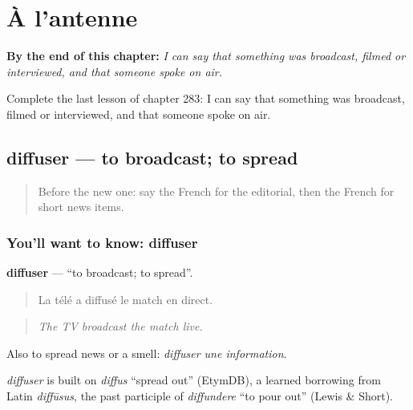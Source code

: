 
\chapter{À l'antenne}
\label{ch:fr-a-l-antenne}

\begin{chapteropening}
\textbf{By the end of this chapter:} \emph{I can say that something was broadcast, filmed or interviewed, and that someone spoke on air.}

Complete the last lesson of chapter 283: I can say that something was broadcast, filmed or interviewed, and that someone spoke on air.
\end{chapteropening}

\section[diffuser]{diffuser — to broadcast; to spread}

\label{lesson:FR-C283-diffuser}



\begin{quote}
Before the new one: say the French for the editorial, then the French for short news items.
\end{quote}

\subsection*{You'll want to know: diffuser}
\textbf{diffuser} — \textquotedblleft{}to broadcast; to spread\textquotedblright{}.

\begin{quote}
La télé a diffusé le match en direct.
\end{quote}

\begin{quote}
\emph{The TV broadcast the match live.}
\end{quote}

Also to spread news or a smell: \emph{diffuser une information}.

\begin{cousinweb}
\emph{diffuser} is built on \emph{diffus} \textquotedblleft{}spread out\textquotedblright{} (EtymDB), a learned borrowing from Latin \emph{diffūsus}, the past participle of \emph{diffundere} \textquotedblleft{}to pour out\textquotedblright{} (Lewis \& Short).
\end{cousinweb}

